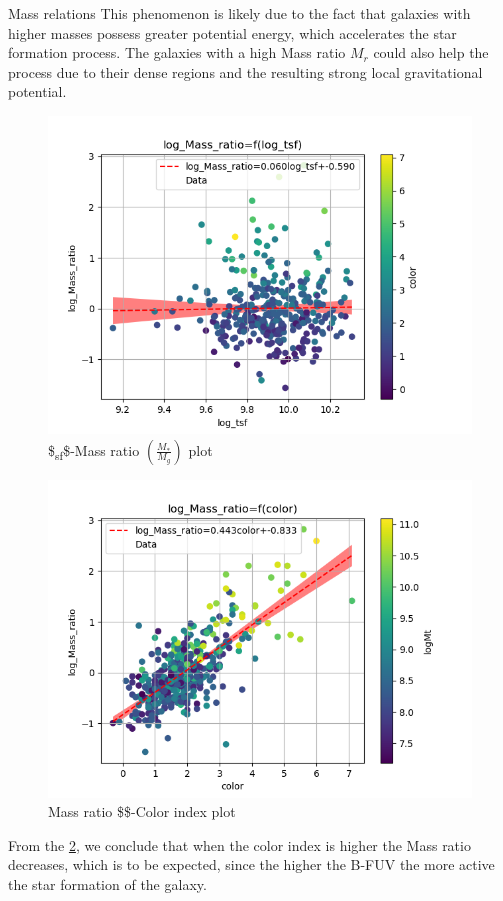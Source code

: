 \documentclass[presentation]{beamer}
\begin{document}
\begin{frame}[label={sec:orgfa6d8ce}]{Mass relations}
This phenomenon is likely due to the fact that galaxies with higher masses possess greater potential energy, which accelerates the star formation process. The galaxies with a high Mass ratio \(M_r\) could also help the process due to their dense regions and the resulting strong local gravitational potential.



\begin{figure}[!htpb]
\centering
\includegraphics[width=.9\linewidth]{./figs/log_tsf-log_Mass_ratio-color_color.png}
\caption{\label{fig:tsf_mr}\$\t\textsubscript{sf}\$-Mass ratio \(\left(\frac{M_*}{M_g}\right)\) plot}
\end{figure}



\begin{figure}[!htpb]
\centering
\includegraphics[width=.9\linewidth]{./figs/color-log_Mass_ratio-color_logMt.png}
\caption{\label{fig:col_Mr}Mass ratio \$\$-Color index plot}
\end{figure}

From the \ref{fig:col_Mr}, we conclude that when the color index is higher the Mass ratio decreases, which is to be expected, since the higher the B-FUV the more active the star formation of the galaxy.
\end{frame}
\end{document}
